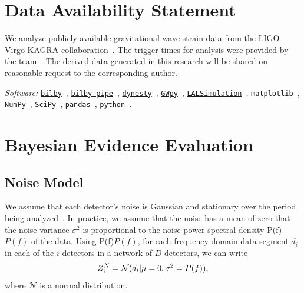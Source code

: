 \documentclass[useAMS,fleqn, usenatbib, final]{mnras}
\newcommand{\code}[1]{{\texttt{#1}}\xspace}
\newcommand{\bilby}{\code{bilby}}
\newcommand{\bilbypipe}{\code{bilby-pipe}}
\newcommand{\dynesty}{\code{dynesty}}
\newcommand{\gwpy}{\code{GWpy}}
\newcommand{\pycbc}{{\sc {{PyCBC}}}\xspace}
\newcommand{\mathcmd}[1]{{\sc \relax\ifmmode#1\else $#1$\fi}\xspace}
\newcommand{\psd}{\mathcmd{P(f)}}
\begin{document}
\section*{Data Availability Statement}
{
We analyze publicly-available gravitational wave strain data from the LIGO-Virgo-KAGRA collaboration~\citep{dataO2}. The trigger times for analysis were provided by the \pycbc team~\citep{pycbc_ogc_2}. The derived data generated in this research will be shared on reasonable request to the corresponding author.
\begin{flushleft}
\textit{Software:} \href{https://lscsoft.docs.ligo.org/bilby/}{\bilby}~\citep[v0.6.8]{bilby}, \href{https://lscsoft.docs.ligo.org/bilby_pipe/master/index.html}{\bilbypipe}~\citep[v0.3.12]{bilby_pipe}, \href{https://dynesty.readthedocs.io/}{\dynesty}~\citep[v0.9.5.3]{dynesty}, \href{https://gwpy.github.io/docs/stable/index.html}{\gwpy}~\citep[v1.0.1]{gwpy}, \href{https://lscsoft.docs.ligo.org/lalsuite/lalsimulation/index.html}{\code{LALSimulation}}~\citep[v6.70]{lalsuite}, \code{matplotlib}~\citep[v3.2.0]{matplotlib}, \code{NumPy}~\citep[v1.8.1]{NumPy}, \code{SciPy}~\citep[v1.4.1]{SciPy}, \code{pandas}~\citep[v1.0.2]{pandas}, \code{python}~\citep[v3.7]{pythonForScientificComputing,pythonForScientists}. 
\end{flushleft}
}








\appendix



\section{Bayesian Evidence Evaluation}\label{sec:bayesianEvidEval}

\subsection{Noise Model}
We assume that each detector's noise is Gaussian and stationary over the period being analyzed~\citep{ligo_psd}. In practice, we assume that the noise has a mean of zero that the noise variance $\sigma^2$ is proportional to the noise power spectral density \psd of the data. Using \psd, for each frequency-domain data segment $d_i$ in each of the $i$ detectors in a network of $D$ detectors, we can write 
\begin{equation}
\label{eq:zn}
Z^N_i = \mathcal{N}(d_i|\mu=0,\sigma^2=\psd),
\end{equation}
where $\mathcal{N}$ is a normal distribution. 
\end{document}
